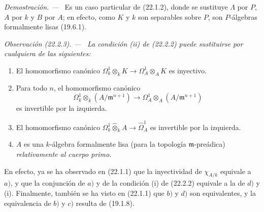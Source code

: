 \documentclass[10pt,oneside]{book}
\makeatletter
\newcommand{\setmanualcurrentlabel}[1]{\def\@currentlabel{#1}}
\newenvironment{remark}[1][]{%
  \setmanualcurrentlabel{#1}\par\medskip\noindent\itshape Observación (#1). ---\ }{\par}
\newenvironment{proof}{%
  \par\medskip\noindent\textit{Demostración. ---\ }}{\par}
\makeatother
\begin{document}
\begin{proof}
Es un caso particular de (22.1.2), donde se sustituye $\Lambda$ por $P$, $A$
por $k$ y $B$ por $A$; en efecto, como $K$ y $k$ son separables sobre $P$,
son $P$-álgebras formalmente lisas (19.6.1).
\end{proof}

\begin{remark}[22.2.3]
\label{0.22.2.3-es}
La condición (ii) de (22.2.2) puede sustituirse por cualquiera de las
siguientes:
\begin{enumerate}
  \item[\textit{a)}] El homomorfismo canónico
  $\Omega^1_k\otimes_kK\to\Omega^1_A\otimes_AK$ es inyectivo.
  \item[\textit{b)}] Para todo $n$, el homomorfismo canónico
  \[
    \Omega^1_k\otimes_k(A/\mathfrak m^{n+1})
    \longrightarrow
    \Omega^1_A\otimes_A(A/\mathfrak m^{n+1})
  \]
  es invertible por la izquierda.
  \item[\textit{c)}] El homomorfismo canónico
  $\Omega^1_k\widehat\otimes_kA\to\widehat\Omega^1_A$ es invertible por la
  izquierda.
  \item[\textit{d)}] $A$ es una $k$-álgebra formalmente lisa (para la topología
  $\mathfrak m$-preádica) \emph{relativamente al cuerpo primo}.
\end{enumerate}
En efecto, ya se ha observado en (22.1.1) que la inyectividad de $\chi_{A/k}$
equivale a $a)$, y que la conjunción de $a)$ y de la condición (i) de (22.2.2)
equivale a la de $d)$ y (i). Finalmente, también se ha visto en (22.1.1) que
$b)$ y $d)$ son equivalentes, y la equivalencia de $b)$ y $c)$ resulta de
(19.1.8).
\end{remark}
\end{document}
